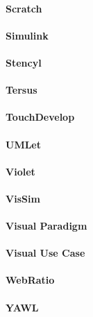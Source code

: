 \paragraph{Scratch}
\paragraph{Simulink}
\paragraph{Stencyl}
\paragraph{Tersus}
\paragraph{TouchDevelop}
\paragraph{UMLet}
\paragraph{Violet}
\paragraph{VisSim}
\paragraph{Visual Paradigm}
\paragraph{Visual Use Case}
\paragraph{WebRatio}
\paragraph{YAWL}
